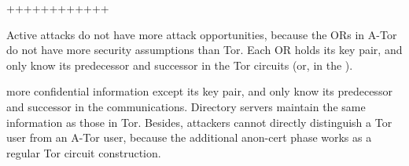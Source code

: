++++++++++++

Active attacks do not have more attack opportunities,
   because the ORs in A-Tor do not have more security assumptions than Tor.
Each OR holds its key pair,
   and only know its predecessor and successor in the Tor circuits
   (or, in the ).


  more confidential information except its key pair, and only know its predecessor and successor in the communications.
Directory servers maintain the same information as those in Tor.
Besides,
  attackers cannot directly distinguish a Tor user from an A-Tor user,
  because the additional anon-cert phase works as a regular Tor circuit construction.




